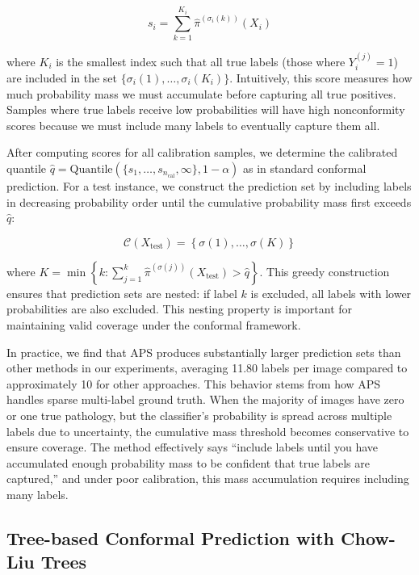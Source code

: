 \begin{equation}
s_i = \sum_{k=1}^{K_i} \hat{\pi}^{(\sigma_i(k))}(X_i)\label{eq:equation8}
\end{equation}

where $K_i$ is the smallest index such that all true labels (those where $Y_i^{(j)} = 1$) are included in the set $\{\sigma_i(1), \ldots, \sigma_i(K_i)\}$.
Intuitively, this score measures how much probability mass we must accumulate before capturing all true positives.
Samples where true labels receive low probabilities will have high nonconformity scores because we must include many labels to eventually capture them all.

After computing scores for all calibration samples, we determine the calibrated quantile $\hat{q} = \text{Quantile}(\{s_1, \ldots, s_{n_{\text{cal}}}, \infty\}, 1-\alpha)$ as in standard conformal prediction.
For a test instance, we construct the prediction set by including labels in decreasing probability order until the cumulative probability mass first exceeds $\hat{q}$:

\begin{equation}
\mathcal{C}(X_{\text{test}}) = \left\{\sigma(1), \ldots, \sigma(K)\right\}\label{eq:equation9}
\end{equation}

where $K = \min\left\{k : \sum_{j=1}^{k} \hat{\pi}^{(\sigma(j))}(X_{\text{test}}) > \hat{q}\right\}$.
This greedy construction ensures that prediction sets are nested: if label $k$ is excluded, all labels with lower probabilities are also excluded.
This nesting property is important for maintaining valid coverage under the conformal framework.

In practice, we find that APS produces substantially larger prediction sets than other methods in our experiments, averaging 11.80 labels per image compared to approximately 10 for other approaches.
This behavior stems from how APS handles sparse multi-label ground truth.
When the majority of images have zero or one true pathology, but the classifier's probability is spread across multiple labels due to uncertainty, the cumulative mass threshold becomes conservative to ensure coverage.
The method effectively says ``include labels until you have accumulated enough probability mass to be confident that true labels are captured,'' and under poor calibration, this mass accumulation requires including many labels.

\subsection{Tree-based Conformal Prediction with Chow-Liu Trees}\label{subsec:tree-based-conformal-prediction-with-chow-liu-trees}

